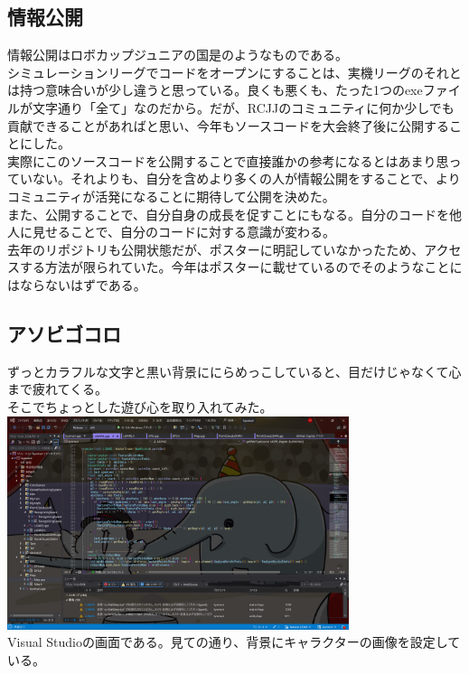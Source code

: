 \documentclass[uplatex,dvipdfmx,a4paper]{jsarticle}
\begin{document}
    \subsection{情報公開}
    情報公開はロボカップジュニアの国是のようなものである。\\
    シミュレーションリーグでコードをオープンにすることは、実機リーグのそれとは持つ意味合いが少し違うと思っている。良くも悪くも、たった1つのexeファイルが文字通り「全て」なのだから。だが、RCJJのコミュニティに何か少しでも貢献できることがあればと思い、今年もソースコードを大会終了後に公開することにした。\\
    実際にこのソースコードを公開することで直接誰かの参考になるとはあまり思っていない。それよりも、自分を含めより多くの人が情報公開をすることで、よりコミュニティが活発になることに期待して公開を決めた。\\
    また、公開することで、自分自身の成長を促すことにもなる。自分のコードを他人に見せることで、自分のコードに対する意識が変わる。\\

    去年のリポジトリも公開状態だが、ポスターに明記していなかったため、アクセスする方法が限られていた。今年はポスターに載せているのでそのようなことにはならないはずである。\\
    

    \subsection{アソビゴコロ}
    ずっとカラフルな文字と黒い背景ににらめっこしていると、目だけじゃなくて心まで疲れてくる。\\
    そこでちょっとした遊び心を取り入れてみた。\\
    \includegraphics[width=100mm]{Photo/photo0.png}\\
    Visual Studioの画面である。見ての通り、背景にキャラクターの画像を設定している。\\
\end{document}
